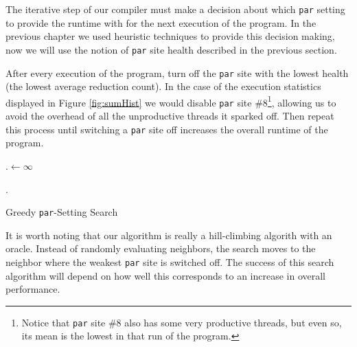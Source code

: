 The iterative step of our compiler must make a decision about which \verb|par|
setting to provide the runtime with for the next execution of the program. In
the previous chapter we used heuristic techniques to provide this decision
making, now we will use the notion of \verb|par| site health described in the
previous section.

After every execution of the program, turn off the \verb'par' site with the
lowest health (the lowest average reduction count). In the case of the
execution statistics displayed in Figure \ref{fig:sumHist} we would disable
\verb-par- site \#8\footnote{Notice that \texttt{par} site \#8 also has some
very productive threads, but even so, its mean is the lowest in that run of the
program.}, allowing us to avoid the overhead of all the unproductive threads it
sparked off.  Then repeat this process until switching a \verb'par' site off
increases the overall runtime of the program.


\begin{algorithm}
\DontPrintSemicolon
{}

\BlankLine

\Last.\Run $\leftarrow \infty$\;
\BlankLine

\BlankLine
\Return \Last.\Setting\;
\caption{Greedy \texttt{par}-Setting Search}
\label{list:greedy}
\end{algorithm}

It is worth noting that our algorithm is really a hill-climbing algorith with
an oracle. Instead of randomly evaluating neighbors, the search moves to the
neighbor where the weakest \verb|par| site is switched off. The success of this
search algorithm will depend on how well this corresponds to an increase in
overall performance.
